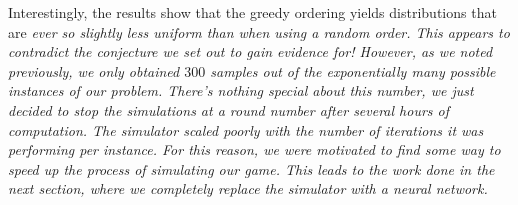 Interestingly, the results show that the greedy ordering yields distributions that are \it{ever so slightly} less uniform than when using a random order.
This appears to contradict the conjecture we set out to gain evidence for!
However, as we noted previously, we only obtained $300$ samples out of the exponentially many possible instances of our problem.
There's nothing special about this number, we just decided to stop the simulations at a round number after several hours of computation.
The simulator scaled poorly with the number of iterations it was performing per instance.
For this reason, we were motivated to find some way to speed up the process of simulating our game.
This leads to the work done in the next section, where we completely replace the simulator with a neural network.